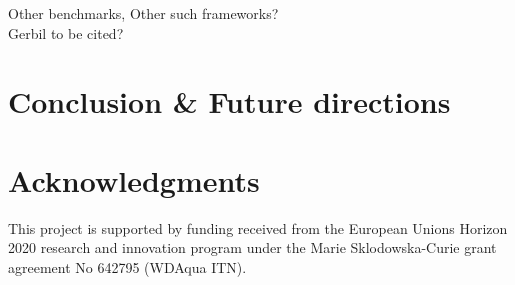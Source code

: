 \documentclass{llncs}
\begin{document}
    Other benchmarks, Other such frameworks? \\
    Gerbil to be cited?

    
    


\section{Conclusion \& Future directions}

\section*{Acknowledgments}\label{sec:Acknowledgments}
This project is supported by funding received from the European Unions Horizon 2020 research and innovation program under the Marie Sklodowska-Curie grant agreement No 642795 (WDAqua ITN).



\end{document}
